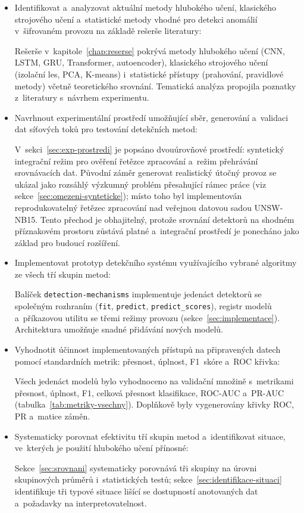 \begin{itemize}
\item Identifikovat a~analyzovat aktuální metody hlubokého učení, klasického strojového učení a~statistické metody vhodné pro detekci anomálií v~šifrovaném provozu na základě rešerše literatury:

Rešerše v~kapitole~\ref{chap:reserse} pokrývá metody hlubokého učení (CNN, LSTM, GRU, Transformer, autoencoder), klasického strojového učení (izolační les, PCA, K-means) i~statistické přístupy (prahování, pravidlové metody) včetně teoretického srovnání. Tematická analýza propojila poznatky z~literatury s~návrhem experimentu.

\item Navrhnout experimentální prostředí umožňující sběr, generování a~validaci dat síťových toků pro testování detekčních metod:

V~sekci~\ref{sec:exp-prostredi} je popsáno dvouúrovňové prostředí: syntetický integrační režim pro ověření řetězce zpracování a~režim přehrávání srovnávacích dat. Původní záměr generovat realistický útočný provoz se ukázal jako rozsáhlý výzkumný problém přesahující rámec práce (viz sekce~\ref{sec:omezeni-synteticke}); místo toho byl implementován reprodukovatelný řetězec zpracování nad veřejnou datovou sadou UNSW-NB15. Tento přechod je obhajitelný, protože srovnání detektorů na shodném příznakovém prostoru zůstává platné a~integrační prostředí je ponecháno jako základ pro budoucí rozšíření.

\item Implementovat prototyp detekčního systému využívajícího vybrané algoritmy ze všech tří skupin metod:

Balíček \texttt{detection-mechanisms} implementuje jedenáct detektorů se společným rozhraním (\texttt{fit}, \texttt{predict}, \texttt{predict\_scores}), registr modelů a~příkazovou utilitu se třemi režimy provozu (sekce~\ref{sec:implementace}). Architektura umožňuje snadné přidávání nových modelů.

\item Vyhodnotit účinnost implementovaných přístupů na připravených datech pomocí standardních metrik: přesnost, úplnost, F1~skóre a~ROC křivka:

Všech jedenáct modelů bylo vyhodnoceno na validační množině s~metrikami přesnost, úplnost, F1, celková přesnost klasifikace, ROC-AUC a~PR-AUC (tabulka~\ref{tab:metriky-vsechny}). Doplňkově byly vygenerovány křivky ROC, PR a~matice záměn.

\item Systematicky porovnat efektivitu tří skupin metod a~identifikovat situace, ve~kterých je použití hlubokého učení přínosné:

Sekce~\ref{sec:srovnani} systematicky porovnává tři skupiny na úrovni skupinových průměrů i~statistických testů; sekce~\ref{sec:identifikace-situaci} identifikuje tři typové situace lišící se dostupností anotovaných dat a~požadavky na interpretovatelnost.
\end{itemize}

